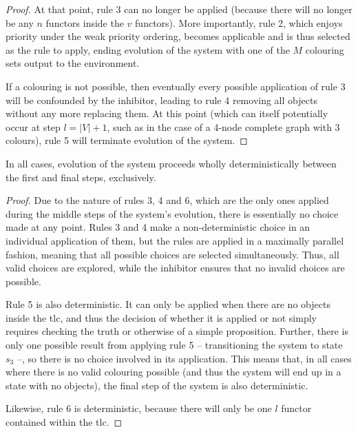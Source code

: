 \begin{proof}
At that point, rule 3 can no longer be applied (because there will no longer be any \(n\) functors inside the \(v\) functors).  More importantly, rule 2, which enjoys priority under the weak priority ordering, becomes applicable and is thus selected as the rule to apply, ending evolution of the system with one of the \(M\) colouring sets output to the environment.

If a colouring is not possible, then eventually every possible application of rule 3 will be confounded by the inhibitor, leading to rule 4 removing all \bo{} objects without any more replacing them.  At this point (which can itself potentially occur at step \(l = |V| + 1\), such as in the case of a 4-node complete graph with 3 colours), rule 5 will terminate evolution of the system.
\end{proof}

\begin{proposition}\label{prop:gcol:determin}
In all cases, evolution of the system proceeds wholly deterministically between the first and final steps, exclusively.
\end{proposition}

\begin{proof}
Due to the nature of rules 3, 4 and 6, which are the only ones applied during the middle steps of the system's evolution, there is essentially no choice made at any point.  Rules 3 and 4 make a non-deterministic choice in an individual application of them, but the rules are applied in a maximally parallel fashion, meaning that all possible choices are selected simultaneously.  Thus, all valid choices are explored, while the inhibitor ensures that no invalid choices are possible.

Rule 5 is also deterministic.  It can only be applied when there are no \bo{} objects inside the \gls{tlc}, and thus the decision of whether it is applied or not simply requires checking the truth or otherwise of a simple proposition.  Further, there is only one possible result from applying rule 5 -- transitioning the system to state \(s_3\) --, so there is no choice involved in its application.  This means that, in all cases where there is no valid colouring possible (and thus the system will end up in a state with no \bo{} objects), the final step of the system is also deterministic.

Likewise, rule 6 is deterministic, because there will only be one \(l\) functor contained within the \gls{tlc}.
\end{proof}

